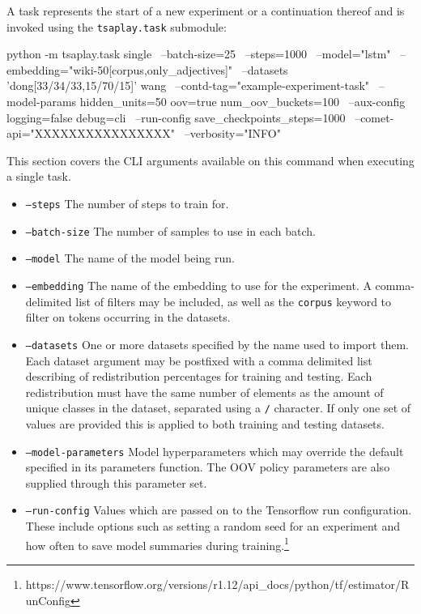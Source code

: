 \documentclass[../../fyp.tex]{subfiles}
\begin{document}
A task represents the start of a new experiment or a continuation thereof and is invoked using the \texttt{tsaplay.task} submodule: 
\begin{code}
	python -m tsaplay.task single \ 
		--batch-size=25 \ 
		--steps=1000 \  
		--model="lstm" \  
		--embedding="wiki-50[corpus,only_adjectives]" \ 
		--datasets 'dong[33/34/33,15/70/15]' wang \ 
		--contd-tag="example-experiment-task" \ 
		--model-params hidden_units=50 oov=true num_oov_buckets=100 \ 
		--aux-config logging=false debug=cli \ 
		--run-config save_checkpoints_steps=1000 \
		--comet-api="XXXXXXXXXXXXXXXX" \
		--verbosity="INFO"
\end{code}

This section covers the CLI arguments available on this command when executing a single task.
\begin{itemize}
\item \texttt{--steps} The number of steps to train for.
\item \texttt{--batch-size} The number of samples to use in each batch.
\item \texttt{--model} The name of the model being run. 
\item \texttt{--embedding} The name of the embedding to use for the experiment. A comma-delimited list of filters may be included, as well as the \texttt{corpus} keyword to filter on tokens occurring in the datasets. 
\item \texttt{--datasets} One or more datasets specified by the name used to import them. Each dataset argument may be postfixed with a comma delimited list describing of redistribution percentages for training and testing. Each redistribution must have the same number of elements as the amount of unique classes in the dataset, separated using a \texttt{/} character. If only one set of values are provided this is applied to both training and testing datasets. 
\item \texttt{--model-parameters} Model hyperparameters which may override the default specified in its parameters function. The OOV policy parameters are also supplied through this parameter set.  
\item \texttt{--run-config} Values which are passed on to the Tensorflow run configuration. These include options such as setting a random seed for an experiment and how often to save model summaries during training.\footnote{https://www.tensorflow.org/versions/r1.12/api\_docs/python/tf/estimator/RunConfig}

\end{itemize}
\end{document}
